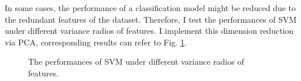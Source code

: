 \documentclass[12pt,a4paper]{article}
\theoremstyle{definition}
\begin{document}
In some cases, the performance of a classification model might be reduced due to the redundant features of the dataset. Therefore, I test the performances of SVM under different variance radios of features. I implement this dimension reduction via PCA, corresponding results can refer to Fig. \ref{fig:svm-dim}.

\begin{figure}[H]
	\centering
	\caption{The performances of SVM under different variance radios of features.}
	\label{fig:svm-dim}
\end{figure}
\end{document}

